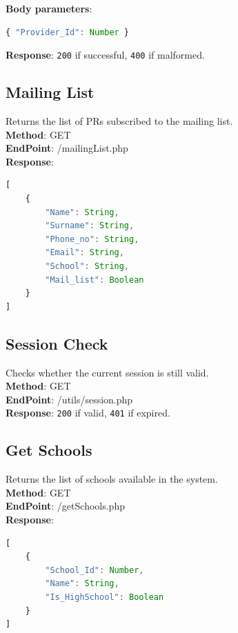 \textbf{Body parameters}:
\begin{lstlisting}[language=JavaScript, basicstyle=\ttfamily]
{ "Provider_Id": Number }
\end{lstlisting}

\textbf{Response}: \texttt{200} if successful, \texttt{400} if malformed.

\subsection{Mailing List}
Returns the list of PRs subscribed to the mailing list.\\

\textbf{Method}: GET \\
\textbf{EndPoint}: /mailingList.php \\

\textbf{Response}:
\begin{lstlisting}[language=JavaScript, basicstyle=\ttfamily]
[
    {
        "Name": String,
        "Surname": String,
        "Phone_no": String,
        "Email": String,
        "School": String,
        "Mail_list": Boolean
    }
]
\end{lstlisting}

\subsection{Session Check}
Checks whether the current session is still valid.\\

\textbf{Method}: GET \\
\textbf{EndPoint}: /utils/session.php \\

\textbf{Response}: \texttt{200} if valid, \texttt{401} if expired.

\subsection{Get Schools}
Returns the list of schools available in the system.\\

\textbf{Method}: GET \\
\textbf{EndPoint}: /getSchools.php \\

\textbf{Response}:
\begin{lstlisting}[language=JavaScript, basicstyle=\ttfamily]
[
    {
        "School_Id": Number,
        "Name": String,
        "Is_HighSchool": Boolean
    }
]
\end{lstlisting}

